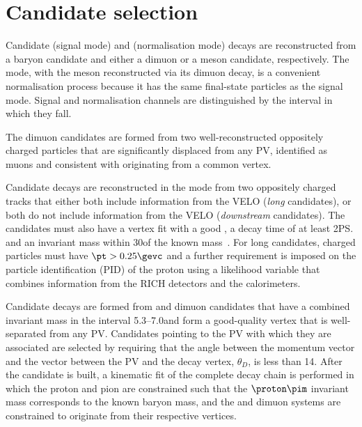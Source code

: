 \section{Candidate selection}

 Candidate \decay{\Lb}{\Lz\mumu} (signal mode) and
 \decay{\Lb}{\jpsi\Lz} (normalisation mode) decays are reconstructed
 from a \Lz baryon candidate and either a dimuon or a \jpsi meson
 candidate, respectively.  The \decay{\Lb}{\jpsi\Lz} mode, with the
 \jpsi meson reconstructed via its dimuon decay, is a convenient
 normalisation process because it has the same final-state particles
 as the signal mode. 
 Signal and normalisation channels are distinguished by the
 \qsq interval in which they fall. 

 The dimuon candidates are formed from two
 well-reconstructed oppositely charged particles that are
 significantly displaced from any PV, identified as muons and
 consistent with originating from a common vertex.
 
 Candidate \Lz decays are reconstructed in the
 \decay{\Lz}{\proton\pim} mode from two oppositely charged tracks that
 either both include information from the VELO (\textit{long}
 candidates), or both do not include information from the VELO
 (\textit{downstream} candidates). The \Lz candidates must also have a
 vertex fit with a good \chisq, a decay time of at least 2\ps and an
 invariant mass within 30\mevcc of the known \Lz
 mass~\cite{Agashe:2014kda}.  For long candidates, charged particles
 must have $\pt>0.25\gevc$ and a further requirement is imposed on the
 particle identification (PID) of the proton using a likelihood
 variable that combines information from the RICH detectors and the
 calorimeters.

 Candidate \Lb decays are formed from \Lz and dimuon candidates that
 have a combined invariant mass in the interval 5.3--7.0\gevcc and
 form a good-quality vertex that is well-separated from any PV.
 Candidates pointing to the PV with which they are associated are
 selected by requiring that the angle between the \Lb momentum vector
 and the vector between the PV and the \Lb decay vertex, $\theta_D$,
 is less than 14\mrad.  After the \Lb candidate is built, a kinematic
 fit \cite{Hulsbergen:2005pu} of the complete decay chain is performed
 in which the proton and pion are constrained such that the
 $\proton\pim$ invariant mass corresponds to the known \Lz baryon
 mass, and the \Lz and dimuon systems are constrained to originate
 from their respective vertices.

